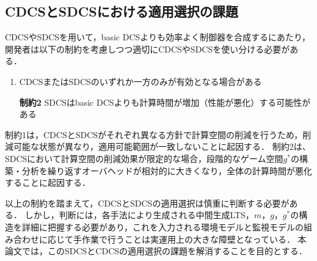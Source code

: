 
\subsection{CDCSとSDCSにおける適用選択の課題}
\label{subsection:limitation}
CDCSやSDCSを用いて，basic DCSよりも効率よく制御器を合成するにあたり，開発者は以下の制約を考慮しつつ適切にCDCSやSDCSを使い分ける必要がある．

\begin{enumerate}[\bf 制約1]
\item CDCSまたはSDCSのいずれか一方のみが有効となる場合がある
\item[\bf 制約2]  SDCSはbasic DCSよりも計算時間が増加（性能が悪化）する可能性がある
\end{enumerate}

制約1は，CDCSとSDCSがそれぞれ異なる方針で計算空間の削減を行うため，削減可能な状態が異なり，適用可能範囲が一致しないことに起因する．
制約2は、SDCSにおいて計算空間の削減効果が限定的な場合，段階的なゲーム空間$g^{*}$の構築・分析を繰り返すオーバヘッドが相対的に大きくなり，全体の計算時間が悪化することに起因する．

以上の制約を踏まえて，CDCSとSDCSの適用選択は慎重に判断する必要がある．
しかし，判断には，各手法により生成される中間生成LTS，$m$，$g$，$g^{*}$の構造を詳細に把握する必要があり，これを入力される環境モデルと監視モデルの組み合わせに応じて手作業で行うことは実運用上の大きな障壁となっている．
本論文では，このSDCSとCDCSの適用選択の課題を解消することを目的とする．




